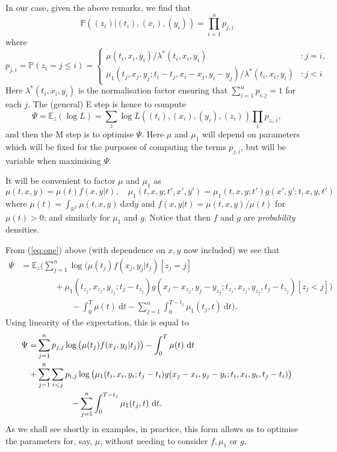\documentclass[twoside,a4paper]{article}
\theoremstyle{plain}
\theoremstyle{definition}
\newcommand{\rd}{\textrm{d}}
\begin{document}
In our case, given the above remarks, we find that
\[ \mathbb P((z_i) | (t_i),(x_i),(y_i)) = \prod_{i=1}^n p_{j,i} \]
where
\[ p_{j,i} = \mathbb P(z_i=j\leq i) = \begin{cases} \mu(t_i,x_i,y_i) / \lambda^*(t_i,x_i,y_i) &: j=i, \\
\mu_1(t_j,x_j,y_j; t_i-t_j,x_i-x_j,y_i-y_j) / \lambda^*(t_i,x_i,y_i) &: j<i \end{cases} \]
Here $\lambda^*(t_i,x_i,y_i)$ is the normalisation factor ensuring that $\sum_{i=1}^n p_{i,j} = 1$ for
each $j$.  The (general) E step is hence to compute
\begin{equation}
\Psi = \mathbb E_z(\log L) = 
\sum_z \log L((t_i),(x_i),(y_i),(z_i))  \prod_i p_{z_i,i},
\label{eq:factors}
\end{equation}
and then the M step is to optimise $\Psi$.  Here $\mu$ and $\mu_1$ will depend on parameters
which will be fixed for the purposes of computing the terms $p_{j,i}$, but will be
variable when maximising $\Psi$.

It will be convenient to factor $\mu$ and $\mu_1$ as
\[ \mu(t,x,y) = \mu(t) f(x,y|t), \quad \mu_1(t,x,y;t',x',y')
= \mu_1(t,x,y;t') g(x',y';t,x,y,t') \]
where $\mu(t) = \int_{\mathbb R^2} \mu(t,x,y) \ \rd x \rd y$ and $f(x,y|t) = \mu(t,x,y) / \mu(t)$ for
$\mu(t)>0$; and similarly for $\mu_1$ and $g$.  Notice that then $f$ and $g$ are
\emph{probability} densities.  

From (\ref{eq:one}) above (with dependence on $x,y$ now included) we see that
\begin{align*} \Psi &= \mathbb E_z\Big(
\sum_{j=1}^n \log \big( \mu(t_j)f(x_j,y_j|t_j)[z_j=j]
	\\ &\qquad\qquad + \mu_1(t_{z_j},x_{z_j},y_{z_j};t_j - t_{z_j})
	g(x_j - x_{z_j},y_j - y_{z_j}; t_{z_j},x_{z_j},y_{z_j},t_j - t_{z_j}) [z_j<j] \big)
\\ &\qquad\qquad\qquad
-\int_0^T \mu(t) \ \rd t - \sum_{j=1}^n\int_{0}^{T-t_j} \mu_1(t_j, t) \ \rd t
\Big).
\end{align*}
Using linearity of the expectation, this is equal to
\begin{align}
\Psi=&\sum_{j=1}^n p_{j,j} \log \big( \mu(t_j)f(x_j,y_j|t_j)\big)
    - \int_0^T \mu(t) \ \rd t \notag\\
+ &\sum_{j=1}^n \sum_{i<j} p_{i,j}
	\log\big(\mu_1(t_i,x_i,y_i;t_j - t_i)
	g(x_j - x_i,y_j - y_i; t_i,x_i,y_i,t_j - t_i) \big)
\notag\\ & \qquad\qquad
- \sum_{j=1}^n\int_{0}^{T-t_j} \mu_1(t_j, t) \ \rd t. \label{eq:two}
\end{align}
As we shall see shortly in examples, in practice, this form allows us to optimise
the parameters for, say, $\mu$, without needing to consider $f,\mu_1$ or $g$.
\end{document}
